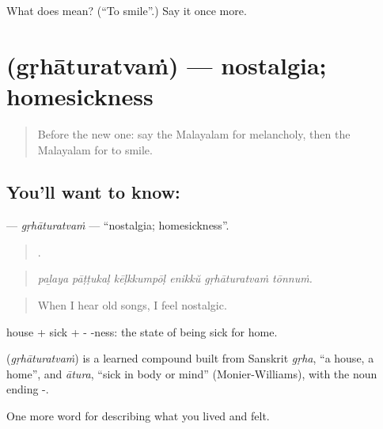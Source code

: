 \begin{tcolorbox}[breakable,colback=teal!4,colframe=teal!35!black,title={Before you move on}]
What does  mean? (\textquotedblleft{}To smile\textquotedblright{}.) Say it once more.
\end{tcolorbox}
\section[\texorpdfstring{\ml{ഗൃഹാതുരത്വം} (gṛhāturatvaṁ)}{ഗൃഹാതുരത്വം (gṛhāturatvaṁ)}]{ (gṛhāturatvaṁ) — nostalgia; homesickness}

\label{lesson:ML-C521-grhaturatvam}



\begin{quote}
Before the new one: say the Malayalam for melancholy, then the Malayalam for to smile.
\end{quote}

\subsection*{You'll want to know: }
\textbf{} — \emph{gṛhāturatvaṁ} — \textquotedblleft{}nostalgia; homesickness\textquotedblright{}.

\begin{quote}
     .
\end{quote}

\begin{quote}
\emph{paḻaya pāṭṭukaḷ kēḷkkumpōḷ enikkŭ gṛhāturatvaṁ tōnnuṁ.}
\end{quote}

\begin{quote}
When I hear old songs, I feel nostalgic.
\end{quote}

 house +  sick + - -ness: the state of being sick for home.

\begin{cousinweb}
\textbf{} (\emph{gṛhāturatvaṁ}) is a learned compound built from Sanskrit \emph{gṛha}, \textquotedblleft{}a house, a home\textquotedblright{}, and \emph{ātura}, \textquotedblleft{}sick in body or mind\textquotedblright{} (Monier-Williams), with the noun ending -.
\end{cousinweb}

\begin{grammarlens}[title={What you've built}]
One more word for describing what you lived and felt.
\end{grammarlens}

